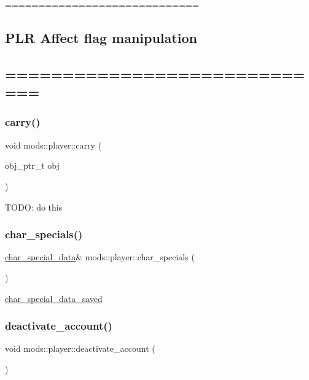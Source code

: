 ============================= \subsection*{P\+LR Affect flag manipulation }

\subsection*{============================= }\mbox{\label{classmods_1_1player_a3dfd0e5a7bb17c98cfa5031b02620cbb}} 
\subsubsection{\texorpdfstring{carry()}{carry()}}
{\footnotesize\ttfamily void mods\+::player\+::carry (\begin{DoxyParamCaption}\item[{obj\+\_\+ptr\+\_\+t}]{obj }\end{DoxyParamCaption})}

T\+O\+DO\+: do this \mbox{\label{classmods_1_1player_af85ed0368fd327f3747b4d1e6572cccc}} 
\subsubsection{\texorpdfstring{char\+\_\+specials()}{char\_specials()}}
{\footnotesize\ttfamily \hyperlink{structchar__special__data}{char\+\_\+special\+\_\+data}\& mods\+::player\+::char\+\_\+specials (\begin{DoxyParamCaption}{ }\end{DoxyParamCaption})\hspace{0.3cm}{\ttfamily [inline]}}

\hyperlink{structchar__special__data__saved}{char\+\_\+special\+\_\+data\+\_\+saved} \mbox{\label{classmods_1_1player_abbbcc9a9d532b3fbfcd16faeb72e8a35}} 
\subsubsection{\texorpdfstring{deactivate\+\_\+account()}{deactivate\_account()}}
{\footnotesize\ttfamily void mods\+::player\+::deactivate\+\_\+account (\begin{DoxyParamCaption}{ }\end{DoxyParamCaption})}


